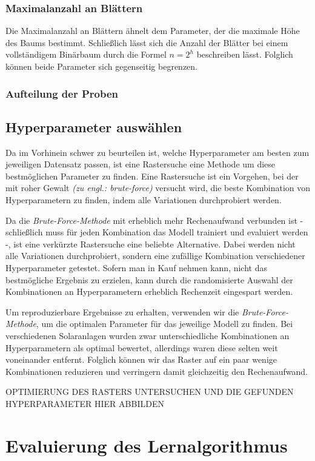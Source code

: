 \documentclass[12pt, a4paper]{article}
\begin{document}
\subsubsection{Maximalanzahl an Blättern}

Die Maximalanzahl an Blättern ähnelt dem Parameter, der die maximale Höhe des Baums bestimmt. Schließlich lässt sich die Anzahl der Blätter bei einem vollständigem Binärbaum durch die Formel $n=2^h$ beschreiben lässt. Folglich können beide Parameter sich gegenseitig begrenzen.

\subsubsection{Aufteilung der Proben}

\subsection{Hyperparameter auswählen}

Da im Vorhinein schwer zu beurteilen ist, welche Hyperparameter am besten zum jeweiligen Datensatz passen, ist eine Rastersuche eine Methode um diese bestmöglichen Parameter zu finden. Eine Rastersuche ist ein Vorgehen, bei der mit roher Gewalt \textit{(zu engl.: brute-force)} versucht wird, die beste Kombination von Hyperparametern zu finden, indem alle Variationen durchprobiert werden.

Da die \textit{Brute-Force-Methode} mit erheblich mehr Rechenaufwand verbunden ist - schließlich muss für jeden Kombination das Modell trainiert und evaluiert werden -, ist eine verkürzte Rastersuche eine beliebte Alternative. Dabei werden nicht alle Variationen durchprobiert, sondern eine zufällige Kombination verschiedener Hyperparameter getestet. Sofern man in Kauf nehmen kann, nicht das bestmögliche Ergebnis zu erzielen, kann durch die randomisierte Auswahl der Kombinationen an Hyperparametern erheblich Rechenzeit eingespart werden.

Um reproduzierbare Ergebnisse zu erhalten, verwenden wir die \textit{Brute-Force-Methode}, um die optimalen Parameter für das jeweilige Modell zu finden. Bei verschiedenen Solaranlagen wurden zwar unterschiedliche Kombinationen an Hyperparametern als optimal bewertet, allerdings waren diese selten weit voneinander entfernt. Folglich können wir das Raster auf ein paar wenige Kombinationen reduzieren und verringern damit gleichzeitig den Rechenaufwand.

OPTIMIERUNG DES RASTERS UNTERSUCHEN UND DIE GEFUNDEN HYPERPARAMETER HIER ABBILDEN

\newpage

\section{Evaluierung des Lernalgorithmus}
\end{document}
